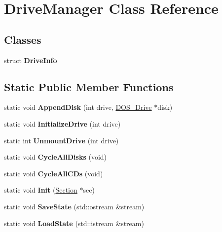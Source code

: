 \hypertarget{classDriveManager}{\section{Drive\-Manager Class Reference}
\label{classDriveManager}
}
\subsection*{Classes}
\begin{DoxyCompactItemize}
\item 
struct {\bfseries Drive\-Info}
\end{DoxyCompactItemize}
\subsection*{Static Public Member Functions}
\begin{DoxyCompactItemize}
\item 
\hypertarget{classDriveManager_a54920d4970b96e29957472859ad4bead}{static void {\bfseries Append\-Disk} (int drive, \hyperlink{classDOS__Drive}{D\-O\-S\-\_\-\-Drive} $\ast$disk)}\label{classDriveManager_a54920d4970b96e29957472859ad4bead}

\item 
\hypertarget{classDriveManager_a1d0f6529b0092f7b7a466743cbd2f99f}{static void {\bfseries Initialize\-Drive} (int drive)}\label{classDriveManager_a1d0f6529b0092f7b7a466743cbd2f99f}

\item 
\hypertarget{classDriveManager_af6bdeda1b4db20820d7b62a30b6e1b10}{static int {\bfseries Unmount\-Drive} (int drive)}\label{classDriveManager_af6bdeda1b4db20820d7b62a30b6e1b10}

\item 
\hypertarget{classDriveManager_a8d9b7ba9258ddf571eaa1c5bf6c6dfc8}{static void {\bfseries Cycle\-All\-Disks} (void)}\label{classDriveManager_a8d9b7ba9258ddf571eaa1c5bf6c6dfc8}

\item 
\hypertarget{classDriveManager_a4fdec5341d5d213604abdc4d138ea93c}{static void {\bfseries Cycle\-All\-C\-Ds} (void)}\label{classDriveManager_a4fdec5341d5d213604abdc4d138ea93c}

\item 
\hypertarget{classDriveManager_a20f4d4a88de291bb80cce1c9e095af21}{static void {\bfseries Init} (\hyperlink{classSection}{Section} $\ast$sec)}\label{classDriveManager_a20f4d4a88de291bb80cce1c9e095af21}

\item 
\hypertarget{classDriveManager_a905c2094d650f6774eee3ef45bd838f8}{static void {\bfseries Save\-State} (std\-::ostream \&stream)}\label{classDriveManager_a905c2094d650f6774eee3ef45bd838f8}

\item 
\hypertarget{classDriveManager_ac41b944c4e633c7f3553666e59766611}{static void {\bfseries Load\-State} (std\-::istream \&stream)}\label{classDriveManager_ac41b944c4e633c7f3553666e59766611}

\end{DoxyCompactItemize}


